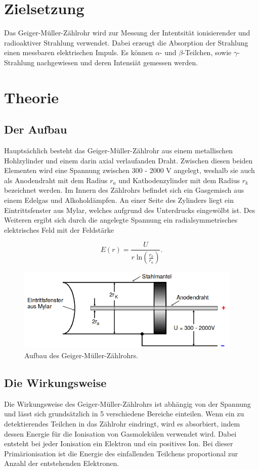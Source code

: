 \section{Zielsetzung}
Das Geiger-Müller-Zählrohr wird zur Messung der Intentsität ionisierender und radioaktiver Strahlung verwendet.
Dabei erzeugt die Absorption der Strahlung einen messbaren elektrischen Impuls.
Es können $\alpha$- und $\beta$-Teilchen, sowie $\gamma$-Strahlung nachgewiesen und deren Intensiät gemessen werden.
\section{Theorie}
\subsection{Der Aufbau}
Hauptsächlich besteht das Geiger-Müller-Zählrohr aus einem metallischen Hohlzylinder und einem darin axial verlaufanden Draht.
Zwischen diesen beiden Elementen wird eine Spannung zwischen 300 - 2000 V angelegt, weshalb sie auch als Anodendraht mit dem  Radius $r_a$ und Kathodenzylinder mit dem Radius $r_k$ bezeichnet werden.
Im Innern des Zählrohrs befindet sich ein Gasgemisch aus einem Edelgas und Alkoholdämpfen. 
An einer Seite des Zylinders liegt ein Eintrittsfenster aus Mylar, welches aufgrund des Unterdrucks eingewölbt ist.
Des Weiteren ergibt sich durch die angelegte Spannung ein radialsymmetrisches elektrisches Feld mit der Feldstärke

\begin{equation}
    E (r) = \frac{U}{r \; \text{ln}\left(\frac{r_k}{r_a}\right)}.
\end{equation}

\begin{figure}[h]
    \centering
    \includegraphics[height=4cm]{Theorie/Aufbau.png}
    \caption{Aufbau des Geiger-Müller-Zählrohrs.}
    \label{fig:aufbau}
\end{figure}

\subsection{Die Wirkungsweise}
Die Wirkungsweise des Geiger-Müller-Zählrohrs ist abhängig von der Spannung und lässt sich grundsätzlich in 5 verschiedene Bereiche einteilen.
Wenn ein zu detektierendes Teilchen in das Zählrohr eindringt, wird es absorbiert, indem dessen Energie für die Ionisation von Gasmolekülen verwendet wird.
Dabei entsteht bei jeder Ionisation ein Elektron und ein positives Ion.
Bei dieser Primärionisation ist die Energie des einfallenden Teilchens proportional zur Anzahl der entstehenden Elektronen.

